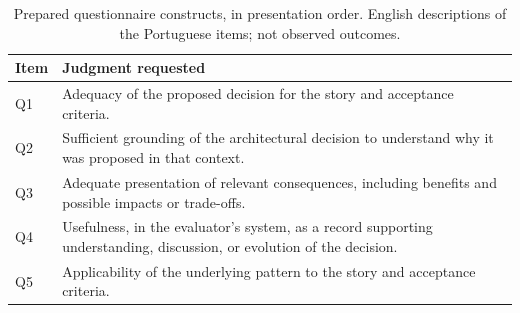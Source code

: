 \begin{table}[t]
\caption{Prepared questionnaire constructs, in presentation order.
English descriptions of the Portuguese items; not observed outcomes.}
\label{tab:expert-constructs}
\centering
\begin{tabular}{lp{}}
\hline
\textbf{Item} & \textbf{Judgment requested} \\
\hline
Q1 & Adequacy of the proposed decision for the story and acceptance criteria. \\
Q2 & Sufficient grounding of the architectural decision to understand why it was proposed in that context. \\
Q3 & Adequate presentation of relevant consequences, including benefits and possible impacts or trade-offs. \\
Q4 & Usefulness, in the evaluator's system, as a record supporting understanding, discussion, or evolution of the decision. \\
Q5 & Applicability of the underlying pattern to the story and acceptance criteria. \\
\hline
\end{tabular}
\end{table}
